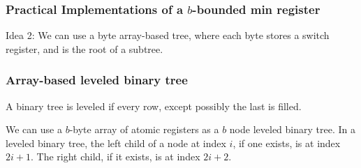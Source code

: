 \documentclass{beamer}
\DeclarePairedDelimiter\floor{\lfloor}{\rfloor}
\begin{document}
\begin{frame}
\frametitle{Practical Implementations of a $b$-bounded min register}
Idea 2: We can use a byte array-based tree, where each byte stores a switch register, and is the root of a subtree.
\end{frame}
\begin{frame}[fragile]
\frametitle{Array-based leveled binary tree}
\begin{definition}
	A binary tree is leveled if every row, except possibly the last is filled.
\end{definition}
We can use a $b$-byte array of atomic registers as a $b$ node leveled binary tree. 
In a leveled binary tree, the left child of a node at index $i$, if one exists, is at index $2i + 1$.
The right child, if it exists, is at index $2i + 2$.
\begin{figure}
	\begin{subfigure}[b]{0.47\textwidth}
	\centering
	\hspace{10cm}
	\end{subfigure}
\hfill
	\begin{subfigure}[b]{0.47\textwidth}
	\end{subfigure}
\end{figure}
\end{frame}
\begin{comment}
\begin{frame}
The number of nodes in the left subtree in a leveled binary tree of size $n$:
\begin{align*}
	a(n) = He(n) \cdot (n + 2^{\floor{\log_2(n)}-1} - 1) + (-1)^{He(n)}\cdot(2^{\floor{\log_2(n)}} - 1)
\end{align*}
where 
\begin{align*}
	He(n) = H(-n + 3\cdot2^{\floor{\log_2(n)}-1} - 1) 
\end{align*}
and 
\begin{align*}
	H(x) = [x \ge 0]
\end{align*}
Proof by Bozinovski available here.
https://oeis.org/A279521
\end{frame}
\end{comment}
\end{document}
